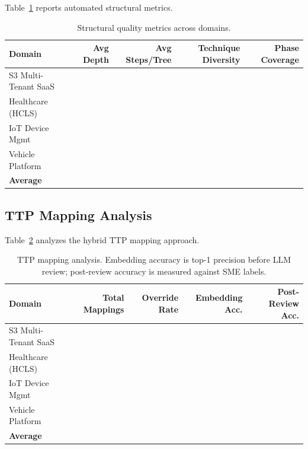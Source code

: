 Table~\ref{tab:structural} reports automated structural metrics.

\begin{table}[t]
\centering
\caption{Structural quality metrics across domains.}
\label{tab:structural}
\begin{tabular}{lrrrr}
\toprule
\textbf{Domain} & \textbf{Avg Depth} & \textbf{Avg Steps/Tree} & \textbf{Technique Diversity} & \textbf{Phase Coverage} \\
\midrule
S3 Multi-Tenant SaaS & \todo{} & \todo{} & \todo{} & \todo{} \\
Healthcare (HCLS) & \todo{} & \todo{} & \todo{} & \todo{} \\
IoT Device Mgmt & \todo{} & \todo{} & \todo{} & \todo{} \\
Vehicle Platform & \todo{} & \todo{} & \todo{} & \todo{} \\
\midrule
\textbf{Average} & \todo{} & \todo{} & \todo{} & \todo{} \\
\bottomrule
\end{tabular}
\end{table}

\subsection{TTP Mapping Analysis}

Table~\ref{tab:ttp} analyzes the hybrid TTP mapping approach.

\begin{table}[t]
\centering
\caption{TTP mapping analysis. Embedding accuracy is top-1 precision before LLM review; post-review accuracy is measured against SME labels.}
\label{tab:ttp}
\begin{tabular}{lrrrr}
\toprule
\textbf{Domain} & \textbf{Total Mappings} & \textbf{Override Rate} & \textbf{Embedding Acc.} & \textbf{Post-Review Acc.} \\
\midrule
S3 Multi-Tenant SaaS & \todo{} & \todo{} & \todo{} & \todo{} \\
Healthcare (HCLS) & \todo{} & \todo{} & \todo{} & \todo{} \\
IoT Device Mgmt & \todo{} & \todo{} & \todo{} & \todo{} \\
Vehicle Platform & \todo{} & \todo{} & \todo{} & \todo{} \\
\midrule
\textbf{Average} & \todo{} & \todo{} & \todo{} & \todo{} \\
\bottomrule
\end{tabular}
\end{table}

